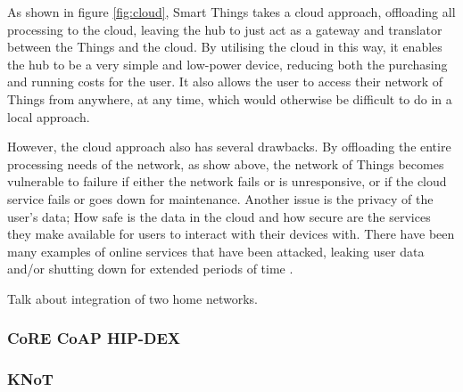 As shown in figure \ref{fig:cloud}, Smart Things takes a cloud approach, offloading all processing to the cloud, leaving the hub to just act as a gateway and translator between the Things and the cloud. By utilising the cloud in this way, it enables the hub to be a very simple and low-power device, reducing both the purchasing and running costs for the user. It also allows the user to access their network of Things from anywhere, at any time, which would otherwise be difficult to do in a local approach. 

However, the cloud approach also has several drawbacks. By offloading the entire processing needs of the network, as show above, the network of Things becomes vulnerable to failure if either the network fails or is unresponsive, or if the cloud service fails or goes down for maintenance. Another issue is the privacy of the user's data; How safe is the data in the cloud and how secure are the services they make available for users to interact with their devices with. There have been many examples of online services that have been attacked, leaking user data and/or shutting down for extended periods of time \cite{Playstation, Amazon, Google}.

Talk about integration of two home networks.



\subsubsection{CoRE CoAP HIP-DEX} %
\label{ssub:core_coap}

\subsubsection{KNoT} %
\label{ssub:knot}

